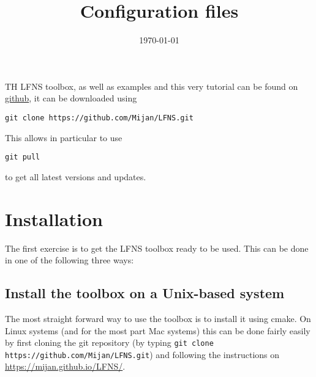 \documentclass[11pt]{article} %
\title{Configuration files}
\date{\today} %
\begin{document}
TH LFNS toolbox, as well as examples and this very tutorial can be found on \href{https://github.com/Mijan/LFNS}{github}, it can be downloaded using 

\begin{tcolorbox}
\begin{verbatim}
git clone https://github.com/Mijan/LFNS.git
\end{verbatim}
\end{tcolorbox}

This allows in particular to use

\begin{tcolorbox}
\begin{verbatim}
git pull
\end{verbatim}
\end{tcolorbox}
 to get all latest versions and updates. 
\section{Installation}
The first exercise is to get the LFNS toolbox ready to be used. This can be done in one of the following three ways: 
\subsection{Install the toolbox on a Unix-based system}
The most straight forward way to use the toolbox is to install it using cmake. On Linux systems (and for the most part Mac systems) this can be done fairly easily by first cloning the git repository (by typing \texttt{git clone https://github.com/Mijan/LFNS.git}) and following the instructions on \href{https://mijan.github.io/LFNS/}{https://mijan.github.io/LFNS/}. 
\end{document}
